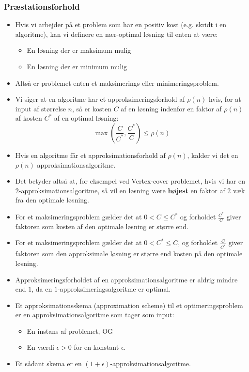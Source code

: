 \begin{frame}[allowframebreaks]
	\frametitle{Præstationsforhold}
	\begin{itemize}
		\item Hvis vi arbejder på et problem som har en positiv kost (e.g. skridt i en algoritme), kan vi definere en nær-optimal løsning til enten at være:
		      \begin{itemize}
			      \item En løsning der er maksimum mulig
			      \item En løsning der er minimum mulig
		      \end{itemize}
		\item Altså er problemet enten et maksimerings eller minimeringsproblem.
		\item Vi siger at en algoritme har et approksimeringsforhold af $\rho(n)$ hvis, for at input af størrelse $n$, så er kosten $C$ af en løsning indenfor en faktor af \(\rho(n)\) af kosten $C^{*}$ af en optimal løsning:
		      \begin{equation}
			      \max \left( \frac{C}{C^{*}}, \frac{C^{*}}{C} \right) \le \rho(n)
		      \end{equation}
		\item Hvis en algoritme får et approksimationsforhold af \(\rho(n)\), kalder vi det en $\rho(n)$ approksimationsalgoritme.
		\item Det betyder altså at, for eksempel ved Vertex-cover problemet, hvis vi har en 2-approksimationsalgoritme, så vil en løsning være \textbf{højest} en faktor af 2 væk fra den optimale løsning.
		\item For et maksimeringsproblem gælder det at $0 < C \le C^{{*}}$ og forholdet $\frac{C^{*}}{C}$ giver faktoren som kosten af den optimale løsning er større end.
		\item For et maksimeringsproblem gælder det at $0 < C^{*} \le C$, og forholdet $\frac{C}{C^{*}}$ giver faktoren som den approksimale løsning er større end kosten på den optimale løsning.
		\item Approksimeringsforholdet af en approksimationsalgoritme er aldrig mindre end 1, da en $1$-approksimeringsalgoritme er optimal.
		\item Et approksimationsskema (approximation scheme) til et optimeringsproblem er en approksimationsalgoritme som tager som input:
		      \begin{itemize}
			      \item En instans af problemet, OG
			      \item En værdi $\epsilon > 0$ for en konstant \(\epsilon\).
		      \end{itemize}

		\item Et sådant skema er en $(1+\epsilon)$-approksimationsalgoritme.
	\end{itemize}
\end{frame}

